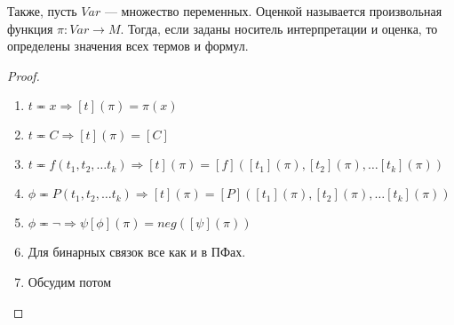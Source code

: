 Также, пусть $Var$ --- множество переменных. Оценкой называется произвольная функция $\pi: Var \rightarrow M$. Тогда, если заданы носитель интерпретации и оценка, то определены значения всех термов и формул.
\begin{proof}\indent
    \begin{enumerate}
        \item $t \eqcirc x \Rightarrow [t](\pi) = \pi(x)$
        \item $t \eqcirc C \Rightarrow [t](\pi) = [C]$
        \item $t \eqcirc f(t_1, t_2, \dots t_k) \Rightarrow [t](\pi) = [f]([t_1](\pi), [t_2](\pi), \dots [t_k](\pi))$
        \item $\phi \eqcirc P(t_1, t_2, \dots t_k) \Rightarrow [t](\pi) = [P]([t_1](\pi), [t_2](\pi), \dots [t_k](\pi))$
        \item $\phi \eqcirc \neg \Rightarrow \psi [\phi](\pi) = neg([\psi](\pi))$
        \item Для бинарных связок все как и в ПФах.
        \item Обсудим потом
    \end{enumerate}
\end{proof}